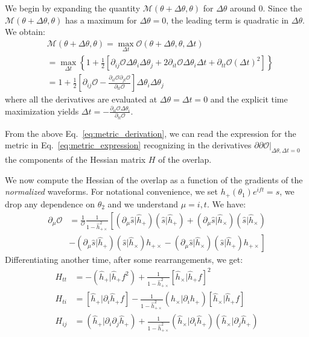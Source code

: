 \documentclass[twocolumn,showpacs,preprintnumbers,nofootinbib,prd,
superscriptaddress,10pt]{revtex4-2}
\newcommand{\rescalar}[2]{( #1 |#2 )}
\newcommand{\imscalar}[2]{[ #1|#2 ]}
\begin{document}
We begin by expanding the quantity $\mathcal{M}(\theta+\Delta\theta,\theta )$ for $\Delta\theta$ around $0$. Since the $\mathcal{M}(\theta+\Delta\theta,\theta )$ has a maximum for $\Delta\theta = 0$, the leading term is quadratic in $\Delta\theta$.
We obtain:
\begin{align} \label{eq:metric_derivation}
	&\mathcal{M}(\theta+\Delta\theta,\theta ) = \max_{\Delta t} \mathcal{O}(\theta + \Delta\theta, \theta, \Delta t) \nonumber\\
	& =	\max_{\Delta t} \left\{ 1+ \frac{1}{2}\left[ \partial_{ij}\mathcal{O} \Delta\theta_i \Delta\theta_j + 2  \partial_{it}\mathcal{O} \Delta\theta_i \Delta t + \partial_{tt}\mathcal{O} (\Delta t)^2 \right] \right\}  \nonumber \\
	&= 1 + \frac{1}{2}\left[ \partial_{ij}\mathcal{O} - \frac{\partial_{it}\mathcal{O} \partial_{jt}\mathcal{O}}{\partial_{tt}\mathcal{O}}\right] \Delta\theta_i \Delta\theta_j
\end{align}
where all the derivatives are evaluated at ${\Delta\theta = \Delta t = 0}$ and the explicit time maximization yields
${\Delta t = -\frac{\partial_{it}\mathcal{O} \Delta\theta_i}{\partial_{tt}\mathcal{O}}}$.

From the above Eq.~\eqref{eq:metric_derivation}, we can read the expression for the metric in Eq.~\eqref{eq:metric_expression} recognizing in the derivatives $\partial\partial\mathcal{O}|_{\Delta\theta, \Delta t = 0}$ the components of the Hessian matrix $H$ of the overlap.

We now compute the Hessian of the overlap as a function of the gradients of the {\it normalized} waveforms. For notational convenience, we set $h_+(\theta_1)e^{ift} = s$, we drop any dependence on $\theta_2$ and we understand $\mu = {i, t}$.
We have:
\begin{align}\label{eq:overlap_grads}
	\partial_{\mu} \mathcal{O} &= \frac{1}{\mathcal{O}} \frac{1}{1-\hat{h}^2_{+\times}}
	\left[
	\rescalar{\partial_\mu\hat{s}}{\hat{h}_+}\rescalar{\hat{s}}{\hat{h}_+} 
	+ \rescalar{\partial_\mu\hat{s}}{\hat{h}_\times}\rescalar{\hat{s}}{\hat{h}_\times} \right. \nonumber \\
	&\left. - \rescalar{\partial_\mu\hat{s}}{\hat{h}_+}\rescalar{\hat{s}}{\hat{h}_\times}h_{+\times}
	- \rescalar{\partial_\mu\hat{s}}{\hat{h}_\times}\rescalar{\hat{s}}{\hat{h}_+}h_{+\times}
	\right]
\end{align}
Differentiating another time, after some rearrangements, we get:
\begin{align}
H_{tt} &= - \rescalar{\hat{h}_+}{\hat{h}_+f^2}
			+ \frac{1}{1-\hat{h}^2_{+\times}} \imscalar{\hat{h}_\times}{\hat{h}_+f}^2 \label{eq:H_tt}\\
H_{ti} &= \imscalar{\hat{h}_+}{\partial_i \hat{h}_+f}
			- \frac{1}{1-\hat{h}^2_{+\times}} \rescalar{\hat{h}_\times}{\partial_i\hat{h}_+} \imscalar{\hat{h}_\times}{\hat{h}_+f} \label{eq:H_ti}\\
H_{ij} &= \rescalar{\hat{h}_+}{\partial_i\partial_j\hat{h}_+}
			+ \frac{1}{1-\hat{h}^2_{+\times}} \rescalar{\hat{h}_\times}{\partial_i\hat{h}_+} \rescalar{\hat{h}_\times}{\partial_j\hat{h}_+} \label{eq:H_ij}
\end{align}
\end{document}
